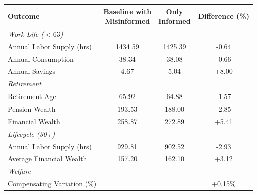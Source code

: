  \begin{tabular}{lccc}
    \toprule
    Outcome & \makecell{Baseline with \\ Misinformed} & \makecell{Only \\ Informed} & Difference (\%) \\
    \midrule
    \midrule
    \multicolumn{4}{l}{\textit{Work Life ($<63$)}} \\
    Annual Labor Supply (hrs) & 1434.59 & 1425.39 & -0.64 \\
    Annual Consumption & 38.34 & 38.08 & -0.66 \\
    Annual Savings & 4.67 & 5.04 & +8.00 \\
    \midrule
    \multicolumn{4}{l}{\textit{Retirement}} \\
    Retirement Age & 65.92 & 64.88 & -1.57 \\
    Pension Wealth & 193.53 & 188.00 & -2.85 \\
    Financial Wealth & 258.87 & 272.89 & +5.41 \\
    \midrule
    \multicolumn{4}{l}{\textit{Lifecycle (30+)}} \\
    Annual Labor Supply (hrs) & 929.81 & 902.52 & -2.93 \\
    Average Financial Wealth & 157.20 & 162.10 & +3.12 \\
    \midrule
    \multicolumn{4}{l}{\textit{Welfare}} \\
    Compensating Variation (\%) & & & +0.15\% \\
    \bottomrule
  \end{tabular}
